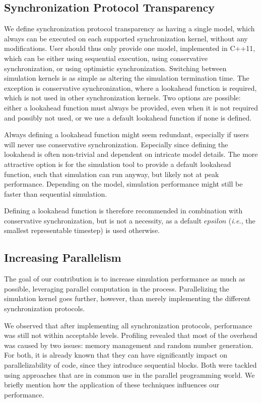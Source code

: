 \subsection{Synchronization Protocol Transparency}
We define synchronization protocol transparency as having a single model, which always can be executed on each supported synchronization kernel, without any modifications.
User should thus only provide one model, implemented in C++11, which can be either using sequential execution, using conservative synchronization, or using optimistic synchronization.
Switching between simulation kernels is as simple as altering the simulation termination time.
The exception is conservative synchronization, where a lookahead function is required, which is not used in other synchronization kernels.
Two options are possible: either a lookahead function must always be provided, even when it is not required and possibly not used, or we use a default lookahead function if none is defined.

Always defining a lookahead function might seem redundant, especially if users will never use conservative synchronization.
Especially since defining the lookahead is often non-trivial and dependent on intricate model details.
The more attractive option is for the simulation tool to provide a default lookahead function, such that simulation can run anyway, but likely not at peak performance.
Depending on the model, simulation performance might still be faster than sequential simulation. 

Defining a lookahead function is therefore recommended in combination with conservative synchronization, but is not a necessity, as a default $epsilon$ (\textit{i.e.}, the smallest representable timestep) is used otherwise.

\subsection{Increasing Parallelism}
The goal of our contribution is to increase simulation performance as much as possible, leveraging parallel computation in the process.
Parallelizing the simulation kernel goes further, however, than merely implementing the different synchronization protocols.

We observed that after implementing all synchronization protocols, performance was still not within acceptable levels.
Profiling revealed that most of the overhead was caused by two issues: memory management and random number generation.
For both, it is already known that they can have significantly impact on parallelizability of code, since they introduce sequential blocks.
Both were tackled using approaches that are in common use in the parallel programming world.
We briefly mention how the application of these techniques influences our performance.

